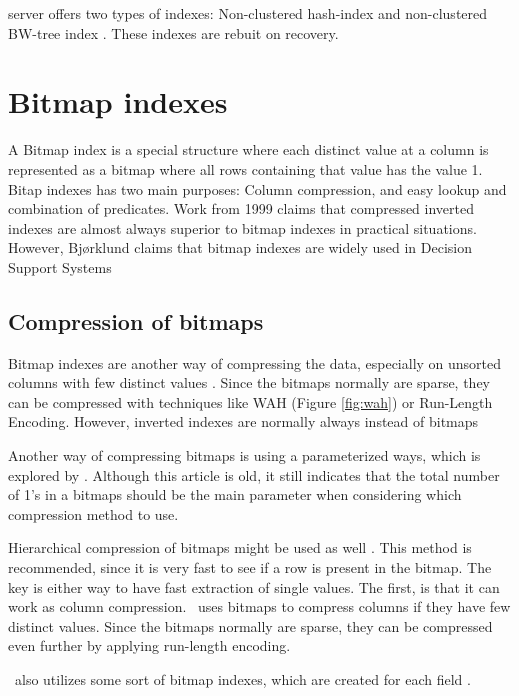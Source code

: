 \mssql server offers two types of indexes: Non-clustered hash-index and non-clustered BW-tree index \cite{Delaney2014-ip, noauthor_undated-vq}. These indexes are rebuit on recovery.

\section{Bitmap indexes}
\label{sec:Bitmap indexes}
A Bitmap index is a special structure where each distinct value at a column is represented as a bitmap where all rows containing that value has the value 1. Bitap indexes has two main purposes: Column compression, and easy lookup and combination of predicates. Work from 1999 \cite{Witten1999-qq} claims that compressed inverted indexes are almost always superior to bitmap indexes in practical situations. However, Bjørklund claims that bitmap indexes are widely used in Decision Support Systems \cite{Bjorklund2011-wh}

\subsection{Compression of bitmaps}
\label{sub:Compression of bitmaps}
Bitmap indexes are another way of compressing the data, especially on unsorted columns with few distinct values \cite{Stonebraker2005-qz}. Since the bitmaps normally are sparse, they can be compressed with techniques like WAH \cite{Bjorklund2011-wh} (Figure \ref{fig:wah}) or Run-Length Encoding. However, inverted indexes are normally always instead of bitmaps \cite{Witten1999-qq}

Another way of compressing bitmaps is using a parameterized ways, which is explored by \cite{Moffat1992-tz}. Although this article is old, it still indicates that the total number of 1's in a bitmaps should be the main parameter when considering which compression method to use.

Hierarchical compression of bitmaps might be used as well \cite{Witten1999-qq}. This method is recommended, since it is very fast to see if a row is present in the bitmap. The key is either way to have fast extraction of single values.
The first, is that it can work as column compression. \cstore~uses bitmaps to compress columns if they have few distinct values. Since the bitmaps normally are sparse, they can be compressed even further by applying run-length encoding.

\qlikview~also utilizes some sort of bitmap indexes, which are created for each field \cite{Qlik2011-ef}.

